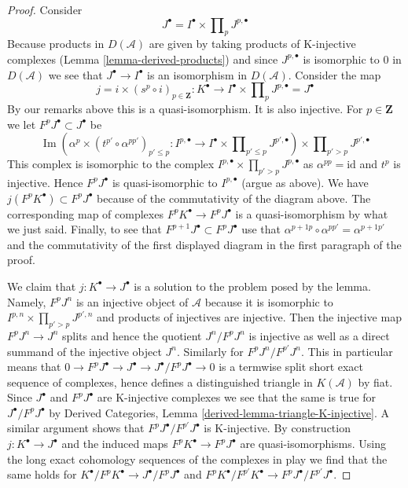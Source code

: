 \documentclass{stacks-project}
\theoremstyle{plain}
\theoremstyle{definition}
\theoremstyle{remark}
\numberwithin{equation}{subsection}
\def\Im{\mathop{\mathrm{Im}}}
\begin{document}
\begin{proof}
\medskip\noindent
Consider
$$
J^\bullet = I^\bullet \times \prod\nolimits_p J^{p, \bullet}
$$
Because products in $D(\mathcal{A})$ are given by taking
products of K-injective complexes
(Lemma \ref{lemma-derived-products})
and since $J^{p, \bullet}$
is isomorphic to $0$ in $D(\mathcal{A})$ we see that
$J^\bullet \to I^\bullet$ is an isomorphism in $D(\mathcal{A})$.
Consider the map
$$
j = i \times (s^p \circ i)_{p \in \mathbf{Z}} :
K^\bullet
\longrightarrow
I^\bullet \times \prod\nolimits_p J^{p, \bullet} = J^\bullet
$$
By our remarks above this is a quasi-isomorphism. It is also injective.
For $p \in \mathbf{Z}$ we let $F^pJ^\bullet \subset J^\bullet$ be
$$
\Im\left(
\alpha^p \times (t^{p'} \circ \alpha^{pp'})_{p' \leq p} :
I^{p, \bullet}
\to
I^\bullet \times \prod\nolimits_{p' \leq p} J^{p', \bullet}
\right)
\times \prod\nolimits_{p' > p} J^{p', \bullet}
$$
This complex is isomorphic to the complex
$I^{p, \bullet} \times \prod_{p' > p} J^{p, \bullet}$
as $\alpha^{pp} = \text{id}$ and $t^p$ is injective.
Hence $F^pJ^\bullet$ is quasi-isomorphic to $I^{p, \bullet}$ (argue
as above). We have $j(F^pK^\bullet) \subset F^pJ^\bullet$ because
of the commutativity of the diagram above. The corresponding
map of complexes $F^pK^\bullet \to F^pJ^\bullet$ is a quasi-isomorphism
by what we just said. Finally, to see that
$F^{p + 1}J^\bullet \subset F^pJ^\bullet$
use that $\alpha^{p + 1p} \circ \alpha^{pp'} = \alpha^{p + 1p'}$
and the commutativity of the first displayed diagram
in the first paragraph of the proof.

\medskip\noindent
We claim that $j : K^\bullet \to J^\bullet$ is a solution to the
problem posed by the lemma. Namely, $F^pJ^n$ is an injective object
of $\mathcal{A}$ because it is isomorphic to
$I^{p, n} \times \prod_{p' > p} J^{p', n}$ and products of
injectives are injective. Then the injective map $F^pJ^n \to J^n$
splits and hence the quotient $J^n/F^pJ^n$ is injective as well
as a direct summand of the injective object $J^n$.
Similarly for $F^pJ^n/F^{p'}J^n$. This in particular means
that $0 \to F^pJ^\bullet \to J^\bullet \to J^\bullet/F^pJ^\bullet \to 0$
is a termwise split short exact sequence of complexes, hence defines
a distinguished triangle in $K(\mathcal{A})$ by fiat.
Since $J^\bullet$ and $F^pJ^\bullet$ are K-injective complexes
we see that the same is true for $J^\bullet/F^pJ^\bullet$
by Derived Categories, Lemma \ref{derived-lemma-triangle-K-injective}.
A similar argument shows that $F^pJ^\bullet/F^{p'}J^\bullet$
is K-injective. By construction $j : K^\bullet \to J^\bullet$
and the induced maps $F^pK^\bullet \to F^pJ^\bullet$ are
quasi-isomorphisms. Using the long exact cohomology sequences
of the complexes in play we find that the same holds for
$K^\bullet/F^pK^\bullet \to J^\bullet/F^pJ^\bullet$ and
$F^pK^\bullet/F^{p'}K^\bullet \to F^pJ^\bullet/F^{p'}J^\bullet$.
\end{proof}
\end{document}
